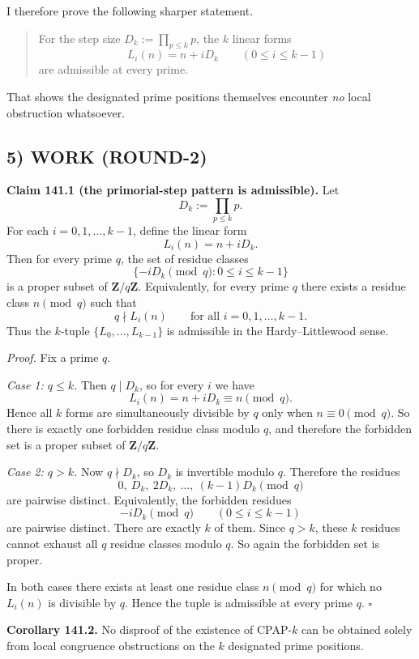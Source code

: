 I therefore prove the following sharper statement.
\begin{quote}
For the step size $D_k:=\prod_{p\le k} p$, the $k$ linear forms
\[
L_i(n)=n+iD_k\qquad (0\le i\le k-1)
\]
are admissible at every prime.
\end{quote}
That shows the designated prime positions themselves encounter \emph{no} local obstruction whatsoever.

\subsection*{5) WORK (ROUND-2)}

\medskip
\noindent\textbf{Claim 141.1 (the primorial-step pattern is admissible).}
Let
\[
D_k:=\prod_{p\le k} p.
\]
For each $i=0,1,\dots,k-1$, define the linear form
\[
L_i(n)=n+iD_k.
\]
Then for every prime $q$, the set of residue classes
\[
\{-iD_k \pmod q: 0\le i\le k-1\}
\]
is a proper subset of $\mathbf Z/q\mathbf Z$.  Equivalently, for every prime $q$ there exists a residue class $n\pmod q$ such that
\[
q \nmid L_i(n) \qquad \text{for all } i=0,1,\dots,k-1.
\]
Thus the $k$-tuple $\{L_0,\dots,L_{k-1}\}$ is admissible in the Hardy--Littlewood sense.

\smallskip
\noindent\emph{Proof.}
Fix a prime $q$.

\smallskip
\noindent\emph{Case 1: $q\le k$.}
Then $q\mid D_k$, so for every $i$ we have
\[
L_i(n)=n+iD_k\equiv n \pmod q.
\]
Hence all $k$ forms are simultaneously divisible by $q$ only when $n\equiv 0\pmod q$.  So there is exactly one forbidden residue class modulo $q$, and therefore the forbidden set is a proper subset of $\mathbf Z/q\mathbf Z$.

\smallskip
\noindent\emph{Case 2: $q>k$.}
Now $q\nmid D_k$, so $D_k$ is invertible modulo $q$.  Therefore the residues
\[
0,\ D_k,\ 2D_k,\ \dots,\ (k-1)D_k \pmod q
\]
are pairwise distinct.  Equivalently, the forbidden residues
\[
-iD_k \pmod q \qquad (0\le i\le k-1)
\]
are pairwise distinct.  There are exactly $k$ of them.  Since $q>k$, these $k$ residues cannot exhaust all $q$ residue classes modulo $q$.  So again the forbidden set is proper.

In both cases there exists at least one residue class $n\pmod q$ for which no $L_i(n)$ is divisible by $q$.  Hence the tuple is admissible at every prime $q$.
\hfill$\square$

\medskip
\noindent\textbf{Corollary 141.2.}  No disproof of the existence of CPAP-$k$ can be obtained solely from local congruence obstructions on the $k$ designated prime positions.

